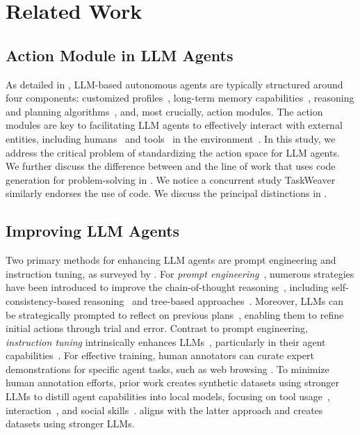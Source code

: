 \section{Related Work}
\subsection{Action Module in LLM Agents}
As detailed in \cite{wang2023survey}, LLM-based autonomous agents are typically structured around four components: customized profiles~\citep{park2023generative, qian2023communicative}, long-term memory capabilities~\citep{zhu2023ghost, fischer2023reflective}, reasoning and planning algorithms~\citep{wei2022chain, chen2023measuring}, and, most crucially, action modules. 
% 
The action modules are key to facilitating LLM agents to effectively interact with external entities, including humans~\citep{lee2022coauthor} and tools~\citep{qin2023tool} in the environment~\citep{wang2023mint,yang2024intercode}. 
% 
In this study, we address the critical problem of standardizing the action space for LLM agents. 
% 
We further discuss the difference between \approach and the line of work that uses code generation for problem-solving in .
%
We notice a concurrent study TaskWeaver~\citep{qiao2023taskweaver} similarly endorses the use of code. We discuss the principal distinctions in .

\subsection{Improving LLM Agents}

Two primary methods for enhancing LLM agents are prompt engineering and instruction tuning, as surveyed by \cite{wang2023survey}.
% 
For \textit{prompt engineering}~\citep{liu2023pre}, numerous strategies have been introduced to improve the chain-of-thought reasoning~\citep{wei2022chain}, including self-consistency-based reasoning~\citep{wang2022self, chen2023measuring} and tree-based approaches~\citep{yao2023tree}. 
% 
Moreover, LLMs can be strategically prompted to reflect on previous plans~\citep{yao2023retroformer, wang2023describe, zhang2023prefer}, enabling them to refine initial actions through trial and error.
% 
Contrast to prompt engineering, \textit{instruction tuning} intrinsically enhances LLMs~\citep{chung2022scaling}, particularly in their agent capabilities~\citep{zeng2023agenttuning, chen2023fireact}. 
% 
For effective training, human annotators can curate expert demonstrations for specific agent tasks, such as web browsing \citep{yao2022webshop, nakano2021webgpt}. 
% 
% 
To minimize human annotation efforts, prior work creates synthetic datasets using stronger LLMs to distill agent capabilities into local models, focusing on tool usage~\citep{Qin2023ToolLLMFL}, interaction~\citep{chen2023dress}, and social skills~\citep{liu2023training}.
% 
\dataname aligns with the latter approach and creates datasets using stronger LLMs.
